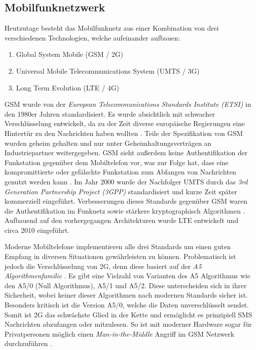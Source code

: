 \documentclass[11pt,a4paper,ngerman]{scrreprt}
\begin{document}
\subsection{Mobilfunknetzwerk}
Heutzutage besteht das Mobilfunknetz aus einer Kombination von drei verschiedenen Technologien, welche aufeinander aufbauen:
\begin{enumerate}
    \item Global System Mobile (GSM / 2G)
    \item Universal Mobile Telecommunications System (UMTS / 3G)
    \item Long Term Evolution (LTE / 4G)
\end{enumerate}
GSM wurde von der \textit{European  Telecommunications  Standards  Institute (ETSI)} in den 1980er Jahren standardisiert. Es wurde absichtlich mit schwacher Verschlüsselung entwickelt, da zu der Zeit diverse europäische Regierungen eine Hintertür zu den Nachrichten haben wollten \cite{mobileSec}. Teile der Spezifikation von GSM wurden geheim gehalten und nur unter Geheimhaltungsverträgen an Industriepartner weitergegeben. GSM sieht außerdem keine Authentifikation der Funkstation gegenüber dem Mobiltelefon vor, was zur Folge hat, dass eine kompromittierte oder gefälschte Funkstation zum Abfangen von Nachrichten genutzt werden kann \cite[S.\,202]{komSec13}. Im Jahr 2000 wurde der Nachfolger UMTS durch das \textit{3rd Generation Partnership Project (3GPP)} standardisiert und kurze Zeit später kommerziell eingeführt. Verbesserungen dieses Standards gegenüber GSM waren die Authentifikation im Funknetz sowie stärkere kryptographisch Algorithmen \cite[S.\,203]{komSec13}. Aufbauend auf den vorhergegangen Architekturen wurde LTE entwickelt und circa 2010 eingeführt.

Moderne Mobiltelefone implementieren alle drei Standards um einen guten Empfang in diversen Situationen gewährleisten zu können. Problematisch ist jedoch die Verschlüsselung von 2G, denn diese basiert auf der \emph{A5 Algorithmenfamilie} \cite{mobileSec}. Es gibt eine Vielzahl von Varianten des A5 Algorithmus wie den A5/0 (Null Algorithmus), A5/1 und A5/2. Diese unterscheiden sich in ihrer Sicherheit, wobei keiner dieser Algorithmen nach modernen Standards sicher ist. Besonders kritisch ist die Version A5/0, welche die Daten unverschlüsselt sendet. Somit ist 2G das schwächste Glied in der Kette und ermöglicht es prinzipiell SMS Nachrichten abzufangen oder mitzulesen. So ist mit moderner Hardware sogar für Privatpersonen möglich einen \textit{Man-in-the-Middle} Angriff im GSM Netzwerk durchzuführen \cite[S.\,202]{komSec13}.
\end{document}
